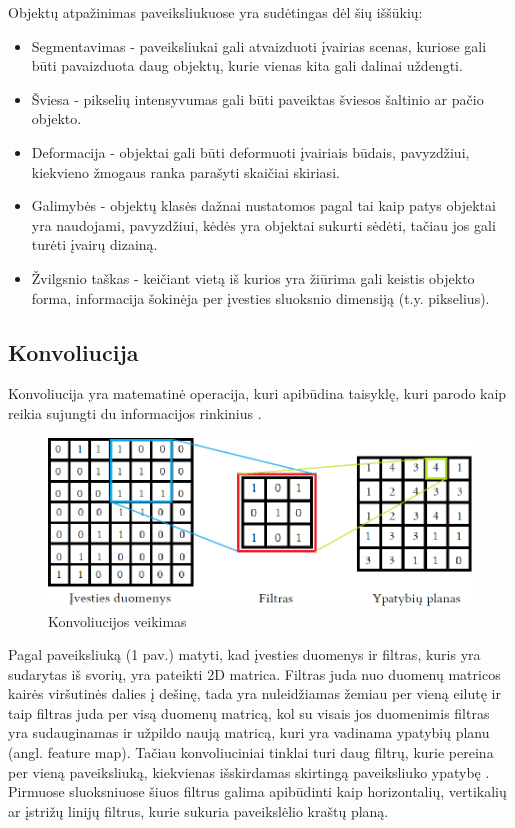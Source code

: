 \documentclass{VUMIFPSkursinis}
\begin{document}
Objektų atpažinimas paveiksliukuose yra sudėtingas dėl šių iššūkių:
\begin{itemize}
\item Segmentavimas - paveiksliukai gali atvaizduoti įvairias scenas, kuriose gali būti pavaizduota daug objektų, kurie vienas kita gali dalinai uždengti.
\item Šviesa - pikselių intensyvumas gali būti paveiktas šviesos šaltinio ar pačio objekto.
\item Deformacija - objektai gali būti deformuoti įvairiais būdais, pavyzdžiui, kiekvieno žmogaus ranka parašyti skaičiai skiriasi.
\item Galimybės - objektų klasės dažnai nustatomos pagal tai kaip patys objektai yra naudojami, pavyzdžiui, kėdės yra objektai sukurti sėdėti, tačiau jos gali turėti įvairų dizainą.
\item Žvilgsnio taškas - keičiant vietą iš kurios yra žiūrima gali keistis objekto forma, informacija šokinėja per įvesties sluoksnio dimensiją (t.y. pikselius). 
\end{itemize}

\subsection{Konvoliucija}
Konvoliucija yra matematinė operacija, kuri apibūdina taisyklę, kuri parodo kaip reikia sujungti du informacijos rinkinius \cite{Convolution-book}. 

\begin{figure}[h]
\centering
\includegraphics[width=1\textwidth]{img/matrix.png}
\caption{Konvoliucijos veikimas}
\end{figure}

Pagal paveiksliuką (1 pav.) matyti, kad įvesties duomenys ir filtras, kuris yra sudarytas iš svorių, yra pateikti 2D matrica. Filtras juda nuo duomenų matricos kairės viršutinės dalies į dešinę, 
tada yra nuleidžiamas žemiau per vieną eilutę ir taip filtras juda per visą duomenų matricą, kol su visais jos duomenimis filtras yra sudauginamas ir užpildo naują matricą, kuri 
yra vadinama ypatybių planu (angl. feature map).
Tačiau konvoliuciniai tinklai turi daug filtrų, kurie pereina per vieną paveiksliuką, kiekvienas išskirdamas skirtingą paveiksliuko ypatybę \cite{DBLP:journals/corr/abs-1708-08711}.
Pirmuose sluoksniuose šiuos filtrus galima apibūdinti kaip horizontalių, vertikalių ar įstrižų linijų filtrus, kurie sukuria paveikslėlio 
kraštų planą.
\end{document}
